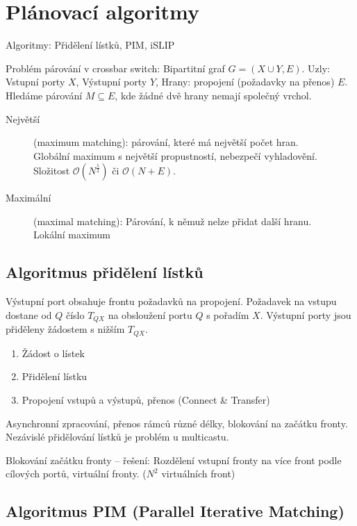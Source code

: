 \documentclass[a4paper, 11pt]{report}
\begin{document}
\section{Plánovací algoritmy}
Algoritmy: Přidělení lístků, PIM, iSLIP

Problém párování v crossbar switch: Bipartitní graf $G=(X\cup Y, E)$. Uzly: Vstupní porty $X$, Výstupní porty $Y$, Hrany: propojení (požadavky na přenos) $E$. Hledáme párování $M \subseteq E$, kde žádné dvě hrany nemají společný vrchol.
\begin{description}
	\item[Největší] (maximum matching): párování, které má největší počet hran.\\
	Globální maximum s největší propustností, nebezpečí vyhladovění. Složitost $\mathcal{O}(N^\frac{5}{2})$ či $\mathcal{O}(N + E)$.
	\item[Maximální] (maximal matching): Párování, k němuž nelze přidat další hranu.\\
	Lokální maximum
\end{description}

\subsection{Algoritmus přidělení lístků}
Výstupní port obsahuje frontu požadavků na propojení. Požadavek na vstupu dostane od $Q$ číslo $T_{QX}$ na obsloužení portu $Q$ s pořadím $X$. Výstupní porty jsou přiděleny žádostem s nižším $T_{QX}$.
\begin{enumerate}
	\item Žádost o lístek
	\item Přidělení lístku
	\item Propojení vstupů a výstupů, přenos (Connect \& Transfer)
\end{enumerate}
Asynchronní zpracování, přenos rámců různé délky, blokování na začátku fronty. Nezávislé přidělování lístků je problém u multicastu.

Blokování začátku fronty -- řešení: Rozdělení vstupní fronty na více front podle cílových portů, virtuální fronty. ($N^2$ virtuálních front)

\subsection{Algoritmus PIM (Parallel Iterative Matching)}
\end{document}

